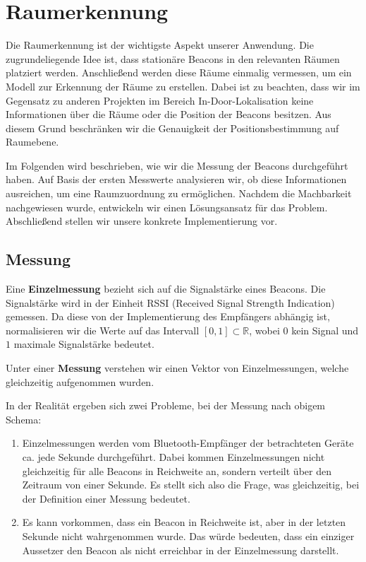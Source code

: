 \section{Raumerkennung}

Die Raumerkennung ist der wichtigste Aspekt unserer Anwendung.
Die zugrundeliegende Idee ist, dass stationäre Beacons in den
relevanten Räumen platziert werden. Anschließend werden diese
Räume einmalig vermessen, um ein Modell zur Erkennung der
Räume zu erstellen.
Dabei ist zu beachten, dass wir im Gegensatz zu anderen Projekten
im Bereich In-Door-Lokalisation keine Informationen über die
Räume oder die Position der Beacons besitzen. Aus diesem Grund
beschränken wir die Genauigkeit der Positionsbestimmung auf
Raumebene.

Im Folgenden wird beschrieben, wie wir die Messung der Beacons
durchgeführt haben. Auf Basis der ersten Messwerte analysieren
wir, ob diese Informationen ausreichen, um eine Raumzuordnung
zu ermöglichen. Nachdem die Machbarkeit nachgewiesen wurde,
entwickeln wir einen Lösungsansatz für das Problem.
Abschließend stellen wir unsere konkrete Implementierung vor.

\subsection{Messung}

Eine \textbf{Einzelmessung} bezieht sich auf die Signalstärke eines Beacons.
Die Signalstärke wird in der Einheit RSSI (Received Signal Strength Indication)
gemessen. Da diese von der Implementierung des Empfängers abhängig ist,
normalisieren wir die Werte auf das Intervall $[0, 1] \subset \mathbb{R}$, wobei
$0$ kein Signal und $1$ maximale Signalstärke bedeutet.

Unter einer \textbf{Messung} verstehen wir einen Vektor von Einzelmessungen,
welche gleichzeitig aufgenommen wurden.

In der Realität ergeben sich zwei Probleme, bei der Messung nach obigem
Schema:
\begin{enumerate}
	\item Einzelmessungen werden vom Bluetooth-Empfänger der betrachteten
	  Geräte ca. jede Sekunde durchgeführt. Dabei kommen Einzelmessungen nicht
	  gleichzeitig für alle Beacons in Reichweite an, sondern verteilt über
	  den Zeitraum von einer Sekunde. Es stellt sich also die Frage, was
	  gleichzeitig, bei der Definition einer Messung bedeutet.
	\item Es kann vorkommen, dass ein Beacon in Reichweite ist, aber in der
	  letzten Sekunde nicht wahrgenommen wurde. Das würde bedeuten, dass ein
	  einziger Aussetzer den Beacon als nicht erreichbar in der Einzelmessung
	  darstellt.
\end{enumerate}

